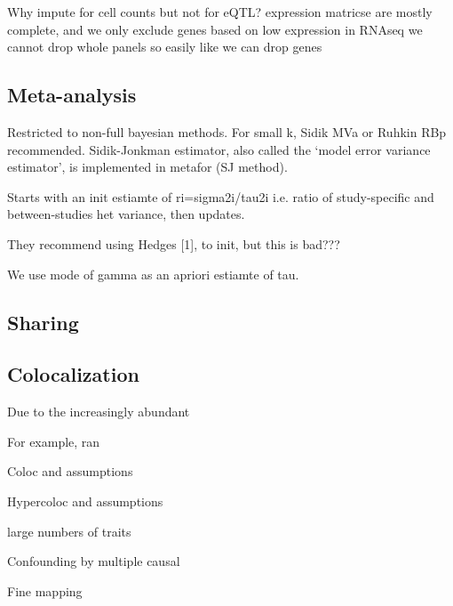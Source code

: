 Why impute for cell counts but not for eQTL?
expression matricse are mostly complete, and we only exclude genes based on low expression in RNAseq
we cannot drop whole panels so easily like we can drop genes

\subsection{Meta-analysis}

Restricted to non-full bayesian methods.
For small k, Sidik MVa or Ruhkin RBp recommended.
Sidik-Jonkman estimator, also called the ‘model error variance estimator’, is implemented in metafor (SJ method).

Starts with an init estiamte of ri=sigma2i/tau2i i.e. ratio of study-specific and between-studies het variance, then updates.

They recommend using Hedges [1], to init, but this is bad???

We use mode of gamma as an apriori estiamte of tau.

\subsection{Sharing}

\subsection{Colocalization}



Due to the increasingly abundant

For example, ran 

Coloc and assumptions

Hypercoloc and assumptions

large numbers of traits

Confounding by multiple causal

Fine mapping

